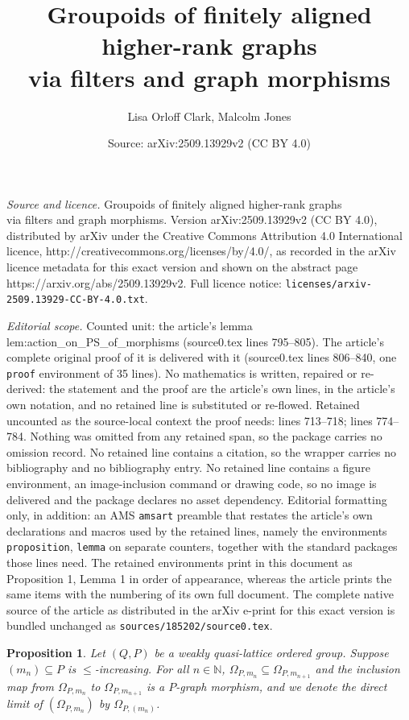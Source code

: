 \documentclass[10pt,a4paper]{amsart}
\title{Groupoids of finitely aligned higher-rank graphs \\ via filters and graph morphisms}
\author{Lisa Orloff Clark, Malcolm Jones}
\date{Source: arXiv:2509.13929v2 (CC BY 4.0)}
\newtheorem{proposition}{Proposition}
\newcommand{\N}{\mathbb{N}}
\begin{document}
\maketitle

\noindent\emph{Source and licence.} Groupoids of finitely aligned higher-rank graphs \\ via filters and graph morphisms. Version arXiv:2509.13929v2 (CC BY 4.0), distributed by arXiv under the Creative Commons Attribution 4.0 International licence, http://creativecommons.org/licenses/by/4.0/, as recorded in the arXiv licence metadata for this exact version and shown on the abstract page https://arxiv.org/abs/2509.13929v2. Full licence notice: \texttt{licenses/arxiv-2509.13929-CC-BY-4.0.txt}.\par\smallskip

\noindent\textit{Editorial scope.} Counted unit: the article's lemma lem:action\_on\_PS\_of\_morphisms (source0.tex lines 795--805). The article's complete original proof of it is delivered with it (source0.tex lines 806--840, one \texttt{proof} environment of 35 lines). No mathematics is written, repaired or re-derived: the statement and the proof are the article's own lines, in the article's own notation, and no retained line is substituted or re-flowed.  Retained uncounted as the source-local context the proof needs: lines 713--718; lines 774--784.  Nothing was omitted from any retained span, so the package carries no omission record.  No retained line contains a citation, so the wrapper carries no bibliography and no bibliography entry.  No retained line contains a figure environment, an image-inclusion command or drawing code, so no image is delivered and the package declares no asset dependency.  Editorial formatting only, in addition: an AMS \texttt{amsart} preamble that restates the article's own declarations and macros used by the retained lines, namely the environments \texttt{proposition}, \texttt{lemma} on separate counters, together with the standard packages those lines need.  The retained environments print in this document as Proposition 1, Lemma 1 in order of appearance, whereas the article prints the same items with the numbering of its own full document.  The complete native source of the article as distributed in the arXiv e-print for this exact version is bundled unchanged as \texttt{sources/185202/source0.tex}.
\begin{proposition}
\label{prop:increasing_sequences_in_P_yield_nested_P_graphs}
Let $(Q, P)$ be a weakly quasi-lattice ordered group.
Suppose $(m_n) \subseteq P$ is $\leq$-increasing.
For all $n \in \N$, $\Omega_{P, m_n} \subseteq \Omega_{P, m_{n+1}}$ and the inclusion map from $\Omega_{P, m_n}$ to $\Omega_{P, m_{n+1}}$ is a $P$-graph morphism, and we denote the direct limit of $(\Omega_{P, m_n})$ by $\Omega_{P, (m_n)}$.
\end{proposition}
\end{document}
